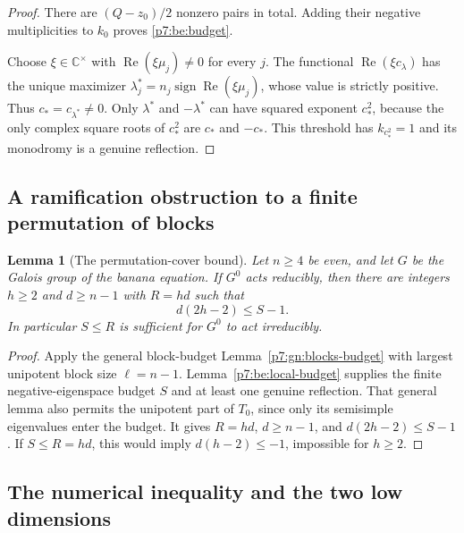 \documentclass[11pt,a4paper]{article}
\newtheorem{lemma}[theorem]{Lemma}
\theoremstyle{definition}
\theoremstyle{remark}
\numberwithin{equation}{section}
\begin{document}
\begin{proof}
There are $(Q-z_0)/2$ nonzero pairs in total. Adding their
negative multiplicities to $k_0$ proves \eqref{p7:be:budget}.

Choose $\xi\in\mathbb C^\times$ with
$\operatorname{Re}(\xi\mu_j)\ne0$ for every $j$.
The functional $\operatorname{Re}(\xi c_\lambda)$ has the unique
maximizer
$\lambda_j^*=n_j\operatorname{sign}\operatorname{Re}(\xi\mu_j)$,
whose value is strictly positive.  Thus $c_*=c_{\lambda^*}\ne0$.
Only $\lambda^*$ and $-\lambda^*$ can have squared exponent
$c_*^2$, because the only complex square roots of $c_*^2$ are
$c_*$ and $-c_*$.  This threshold has $k_{c_*^2}=1$ and its
monodromy is a genuine reflection.
\end{proof}

\subsection{A ramification obstruction to a finite permutation of blocks}

\begin{lemma}[The permutation-cover bound]\label{p7:be:cover}
Let $n\geq4$ be even, and let $G$ be the Galois group of the
banana equation.  If $G^0$ acts reducibly, then there are integers
$h\geq2$ and $d\geq n-1$ with $R=hd$ such that
\begin{equation}\label{p7:be:RH}
                         d(2h-2)\leq S-1.
\end{equation}
In particular $S\leq R$ is sufficient for $G^0$ to act irreducibly.
\end{lemma}

\begin{proof}
Apply the general block-budget Lemma~\ref{p7:gn:blocks-budget}
with largest unipotent block size $\ell=n-1$.
Lemma~\ref{p7:be:local-budget} supplies the finite negative-eigenspace
budget $S$ and at least one genuine reflection.  That general
lemma also permits the unipotent part of $T_0$, since only its
semisimple eigenvalues enter the budget.  It gives
$R=hd$, $d\geq n-1$, and
$d(2h-2)\leq S-1$.
If $S\leq R=hd$, this would imply
$d(h-2)\leq-1$, impossible for $h\geq2$.
\end{proof}

\subsection{The numerical inequality and the two low dimensions}
\end{document}
